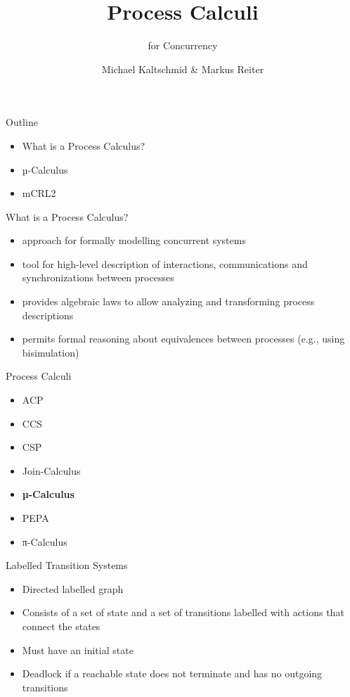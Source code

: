 \documentclass[aspectratio=1610]{beamer}
\title{Process Calculi}
\subtitle{for Concurrency}
\author{Michael Kaltschmid \& Markus Reiter}
\date{}
\begin{document}
  \maketitle

  \begin{frame}{Outline}
    \begin{itemize}
      \item What is a Process Calculus?
      \item µ-Calculus
      \item mCRL2
    \end{itemize}
  \end{frame}

  \begin{frame}{What is a Process Calculus?}
    \begin{itemize}
      \item approach for formally modelling concurrent systems
      \item tool for high-level description of interactions, communications and synchronizations between processes
      \item provides algebraic laws to allow analyzing and transforming process descriptions
      \item permits formal reasoning about equivalences between processes (e.g., using bisimulation)
    \end{itemize}
  \end{frame}

  \begin{frame}{Process Calculi}
    \begin{itemize}
      \item ACP
      \item CCS
      \item CSP
      \item Join-Calculus
      \item \textbf{µ-Calculus}
      \item PEPA
      \item π-Calculus
    \end{itemize}
  \end{frame}

  \begin{frame}{Labelled Transition Systems}
    \begin{itemize}
      \item Directed labelled graph \\
      \item Consists of a set of state and a set of transitions labelled with actions that connect the states \\
      \item Must have an initial state \\
      \item Deadlock if a reachable state does not terminate and has no outgoing transitions \\
    \end{itemize}
  \end{frame}
\end{document}

